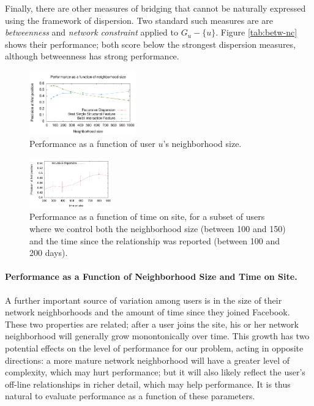 \documentclass{sigchi}
\newcommand{\xhdr}[1]{\paragraph*{\bf #1.}}
\def\rs{\vspace*{-0.10in}}
\begin{document}
Finally, there are other measures of bridging that cannot
be naturally expressed using the framework of dispersion.
Two standard such measures are 
are {\em betweenness} and {\em network constraint} 
\cite{burt-struct-holes-book}
applied to $G_u - \{u\}$.
Figure \ref{tab:betw-nc}
shows their performance;
both score below the strongest dispersion measures,
although betweenness has strong performance.

\begin{figure}
\begin{center}
\includegraphics[width=0.41\textwidth]{perf_by_deg02.pdf}
\end{center}
\caption{
\label{fig:perf_by_deg}
Performance as a function of user $u$'s neighborhood size.
  }
\vspace*{-0.15in}
\end{figure}

\begin{figure}
\begin{center}
\includegraphics[width=0.32\textwidth]{plot-fbage01.pdf}
\end{center}
\caption{
\label{fig:plot-fbage01}
Performance as a function of time on site, for a subset of
users where we control both the neighborhood size (between 100 and 150)
and the time since the relationship was reported 
(between 100 and 200 days).
\rs \rs \rs \rs 
  }
\end{figure}

\xhdr{Performance as a Function of Neighborhood Size and Time on Site}
A further important source of variation among users is in the 
size of their network neighborhoods and the amount of time since
they joined Facebook.
These two properties are related; after a user joins
the site, his or her network neighborhood will generally grow
monontonically over time.
This growth has two potential effects on the level of performance 
for our problem, acting in opposite directions: 
a more mature network neighborhood will have a greater level of complexity,
which may hurt performance; but it will also likely reflect 
the user's off-line relationships in richer detail, which may help
performance.
It is thus natural to evaluate performance as a function of these
parameters.
\end{document}
